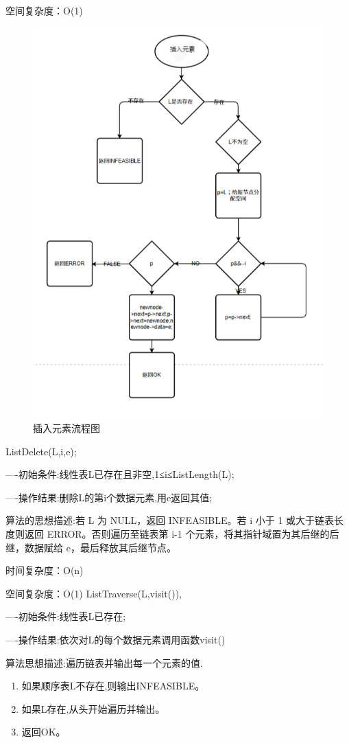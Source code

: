 \documentclass[supercite]{Experimental_Report}
\theoremstyle{definition}
\begin{document}
空间复杂度：O(1)
\begin{figure}[H] %
	\begin{center}
		\includegraphics[width=0.8\linewidth]{images/1.2.6.png}
		\caption{插入元素流程图}
	\end{center}
\end{figure}
ListDelete(L,i,e);

----初始条件:线性表L已存在且非空,1≤i≤ListLength(L);

----操作结果:删除L的第i个数据元素,用e返回其值;

算法的思想描述:若 L 为 NULL，返回 INFEASIBLE。若 i 小于 1 或大于链表长度则返回 ERROR。否则遍历至链表第 i-1 个元素，将其指针域置为其后继的后继，数据赋给 e，最后释放其后继节点。

时间复杂度：O(n)

空间复杂度：O(1)
ListTraverse(L,visit()),

----初始条件:线性表L已存在;

----操作结果:依次对L的每个数据元素调用函数visit()

算法思想描述:遍历链表并输出每一个元素的值.
\begin{enumerate}
	\renewcommand{\labelenumi}{\theenumi)}
	\item 如果顺序表L不存在,则输出INFEASIBLE。
	\item 如果L存在,从头开始遍历并输出。
	\item 返回OK。
\end{enumerate}
\end{document}
